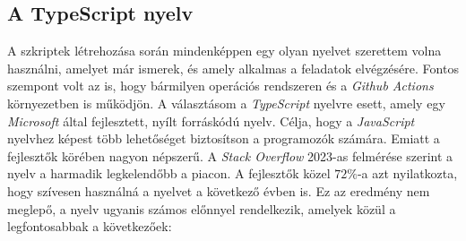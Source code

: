 \subsection{A TypeScript nyelv}

A szkriptek létrehozása során mindenképpen egy olyan nyelvet szerettem volna
használni, amelyet már ismerek, és amely alkalmas a feladatok elvégzésére.
Fontos szempont volt az is, hogy bármilyen operációs rendszeren és a
\textit{Github Actions} környezetben is működjön. A választásom a
\textit{TypeScript} nyelvre esett, amely egy \textit{Microsoft} által
fejlesztett, nyílt forráskódú nyelv. Célja, hogy a \textit{JavaScript} nyelvhez
képest több lehetőséget biztosítson a programozók számára. Emiatt a fejlesztők
körében nagyon népszerű. A \textit{Stack Overflow} 2023-as felmérése szerint
a nyelv a harmadik legkelendőbb a piacon. A fejlesztők közel $72\%$-a azt
nyilatkozta, hogy szívesen használná a nyelvet a következő évben is.
\cite{SO_Survey_2023} Ez az eredmény nem meglepő, a nyelv ugyanis számos
előnnyel rendelkezik, amelyek közül a legfontosabbak a következőek:
